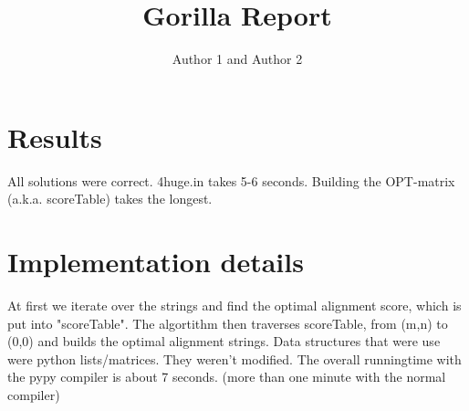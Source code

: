 \documentclass{article}
\title{Gorilla Report}
\author{Author 1 and Author 2}
\begin{document}
  \maketitle

  \section{Results}

                
                All solutions were correct.
                4huge.in takes 5-6 seconds.
                Building the OPT-matrix (a.k.a. scoreTable) takes the longest.

  \section{Implementation details}


                At first we iterate over the strings and find the optimal alignment score, which is put into "scoreTable".
                The algortithm then traverses scoreTable, from (m,n) to (0,0) and builds the optimal alignment strings.
                Data structures that were use were python lists/matrices. They weren't modified.
                The overall runningtime with the pypy compiler is about 7 seconds. (more than one minute with the normal compiler)
\end{document}
